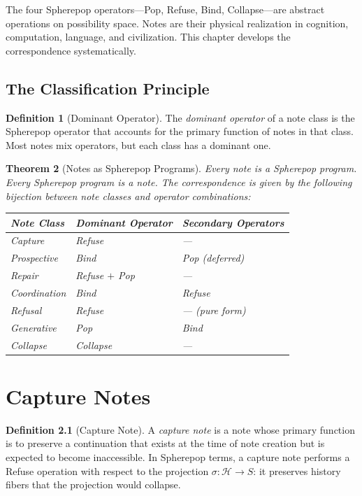 \documentclass[12pt, a4paper, openany]{book}
\theoremstyle{plain}
\newtheorem{theorem}{Theorem}[chapter]
\theoremstyle{definition}
\newtheorem{definition}[theorem]{Definition}
\theoremstyle{remark}
\newcommand{\calH}{\mathcal{H}}
\begin{document}
The four Spherepop operators---Pop, Refuse, Bind, Collapse---are abstract
operations on possibility space. Notes are their physical realization in cognition,
computation, language, and civilization. This chapter develops the correspondence
systematically.

\section{The Classification Principle}

\begin{definition}[Dominant Operator]
The \emph{dominant operator} of a note class is the Spherepop operator that
accounts for the primary function of notes in that class. Most notes mix operators,
but each class has a dominant one.
\end{definition}

\begin{theorem}[Notes as Spherepop Programs]
Every note is a Spherepop program. Every Spherepop program is a note. The
correspondence is given by the following bijection between note classes and
operator combinations:
\begin{center}
\begin{tabular}{lll}
\toprule
Note Class & Dominant Operator & Secondary Operators \\
\midrule
Capture & Refuse & --- \\
Prospective & Bind & Pop (deferred) \\
Repair & Refuse $+$ Pop & --- \\
Coordination & Bind & Refuse \\
Refusal & Refuse & --- (pure form) \\
Generative & Pop & Bind \\
Collapse & Collapse & --- \\
\bottomrule
\end{tabular}
\end{center}
\end{theorem}

\chapter{Capture Notes}

\begin{definition}[Capture Note]
A \emph{capture note} is a note whose primary function is to preserve a
continuation that exists at the time of note creation but is expected to become
inaccessible. In Spherepop terms, a capture note performs a Refuse operation
with respect to the projection $\sigma : \calH \to S$: it preserves history
fibers that the projection would collapse.
\end{definition}
\end{document}
